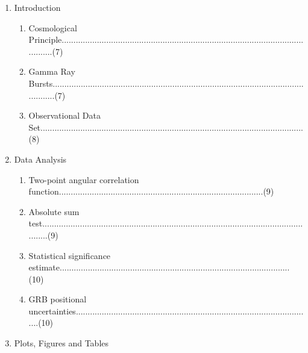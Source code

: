 \documentclass[12pt]{article}
\begin{document}
\begin{enumerate}
\def\labelenumi{\arabic{enumi}.}
\item
  Introduction

  \begin{enumerate}
  \def\labelenumii{\arabic{enumii}.}
  \item
    Cosmological Principle.................................................................................................................(7)
  \item
    Gamma Ray Bursts......................................................................................................................(7)
  \item
    Observational Data Set................................................................................................................(8)
  \end{enumerate}
\item
  Data Analysis

  \begin{enumerate}
  \def\labelenumii{\arabic{enumii}.}
  \item
    Two-point angular correlation function.......................................................................................(9)
  \item
    Absolute sum test.......................................................................................................................(9)
  \item
    Statistical significance estimate..................................................................................................(10)
  \item
    GRB positional uncertainties.....................................................................................................(10)
  \end{enumerate}
\item
  Plots, Figures and Tables


\end{enumerate}
\end{document}
